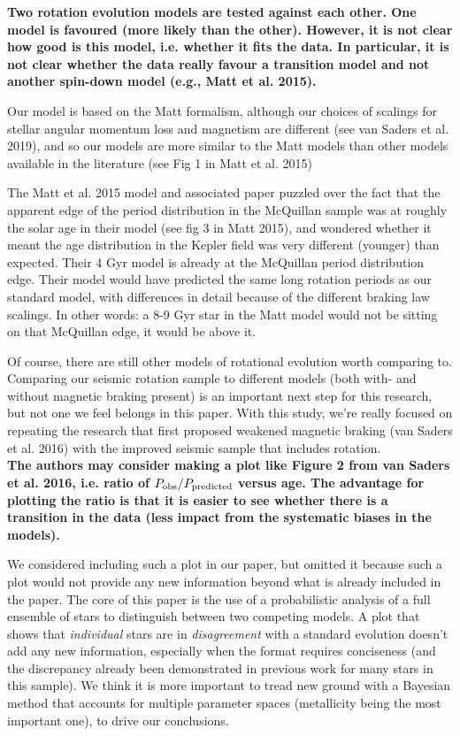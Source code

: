 \documentclass[11pt]{article}
\begin{document}
\noindent\textbf{ Two rotation evolution models are tested against each other. One model is favoured (more likely than the other). However, it is not clear how good is this model, i.e. whether it fits the data. In particular, it is not clear whether the data really favour a transition model and not another spin-down model (e.g., Matt et al. 2015).}

Our model is based on the Matt formalism, although our choices of scalings for stellar angular momentum loss and magnetism are different (see van Saders et al. 2019), and so our models are more similar to the Matt models than other models available in the literature (see Fig 1 in Matt et al. 2015) 

The Matt et al. 2015 model and associated paper puzzled over the fact that the apparent edge of the period distribution in the McQuillan sample was at roughly the solar age in their model (see fig 3 in Matt 2015), and wondered whether it meant the age distribution in the Kepler field was very different (younger) than expected. Their 4 Gyr model is already at the McQuillan period distribution edge. Their model would have predicted the same long rotation periods as our standard model, with differences in detail because of the different braking law scalings. In other words: a 8-9 Gyr star in the Matt model would not be sitting on that McQuillan edge, it would be above it.

Of course, there are still other models of rotational evolution worth comparing to. Comparing our seismic rotation sample to different models (both with- and without magnetic braking present) is an important next step for this research, but not one we feel belongs in this paper. With this study, we’re really focused on repeating the research that first proposed weakened magnetic braking (van Saders et al. 2016) with the improved seismic sample that includes rotation.\\

\noindent\textbf{The authors may consider making a plot like Figure 2 from van Saders et al. 2016, i.e. ratio of $P_{\rm obs}/P_{\rm predicted}$ versus age. The advantage for plotting the ratio is that it is easier to see whether there is a transition in the data (less impact from the systematic biases in the models).}

We considered including such a plot in our paper, but omitted it because such a plot would not provide any new information beyond what is already included in the paper. The core of this paper is the use of a probabilistic analysis of a full ensemble of stars to distinguish between two competing models. A plot that shows that \textit{individual} stars are in \textit{disagreement} with a standard evolution doesn’t add any new information, especially when the format requires conciseness (and the discrepancy already been demonstrated in previous work for many stars in this sample). We think it is more important to tread new ground with a Bayesian method that accounts for multiple parameter spaces (metallicity being the most important one), to drive our conclusions.
\end{document}
